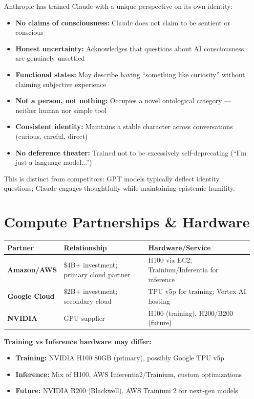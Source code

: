 \documentclass[11pt,a4paper]{article}
\begin{document}
Anthropic has trained Claude with a unique perspective on its own identity:

\begin{itemize}[itemsep=1pt]
  \item \textbf{No claims of consciousness:} Claude does not claim to be sentient or conscious
  \item \textbf{Honest uncertainty:} Acknowledges that questions about AI consciousness are genuinely unsettled
  \item \textbf{Functional states:} May describe having ``something like curiosity'' without claiming subjective experience
  \item \textbf{Not a person, not nothing:} Occupies a novel ontological category --- neither human nor simple tool
  \item \textbf{Consistent identity:} Maintains a stable character across conversations (curious, careful, direct)
  \item \textbf{No deference theater:} Trained not to be excessively self-deprecating (``I'm just a language model...'')
\end{itemize}

This is distinct from competitors: GPT models typically deflect identity questions; Claude engages thoughtfully while maintaining epistemic humility.

\section{Compute Partnerships \& Hardware}

\begin{center}
\begin{tabular}{lL{5cm}L{5cm}}
\toprule
\textbf{Partner} & \textbf{Relationship} & \textbf{Hardware/Service} \\
\midrule
\textbf{Amazon/AWS} & \$4B+ investment; primary cloud partner & H100 via EC2; Trainium/Inferentia for inference \\
\textbf{Google Cloud} & \$2B+ investment; secondary cloud & TPU v5p for training; Vertex AI hosting \\
\textbf{NVIDIA} & GPU supplier & H100 (training), H200/B200 (future) \\
\bottomrule
\end{tabular}
\end{center}

\textbf{Training vs Inference hardware may differ:}
\begin{itemize}[itemsep=1pt]
  \item \textbf{Training:} NVIDIA H100 80GB (primary), possibly Google TPU v5p
  \item \textbf{Inference:} Mix of H100, AWS Inferentia2/Trainium, custom optimizations
  \item \textbf{Future:} NVIDIA B200 (Blackwell), AWS Trainium 2 for next-gen models
\end{itemize}
\end{document}
